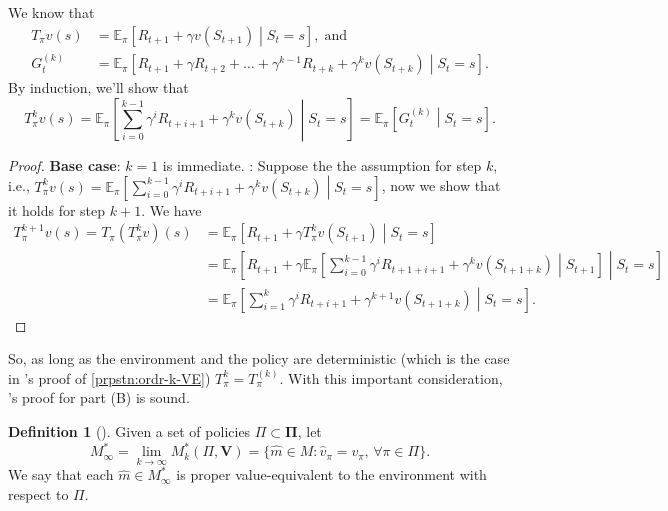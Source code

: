 \documentclass[a4paper]{article}
\theoremstyle{definition}
\newtheorem{definition}{Definition}
\theoremstyle{remark}
\theoremstyle{plain}
\newcommand{\bV}{\mathbf{V}}
\newcommand{\bPi}{\mathbf{\Pi}}
\newcommand{\E}{\mathbb{E}}
\begin{document}
We know that
\begin{align*}
    T_\pi v(s) & = \E_\pi \left[R_{t + 1} + \gamma v(S_{t + 1}) \middle\vert S_t = s\right], \; \text{and} \\
    G^{(k)}_t &= \E_\pi \left[R_{t + 1} + \gamma R_{t + 2} + \dots + \gamma^{k - 1} R_{t + k} + \gamma^k v(S_{t + k}) \middle\vert S_t = s\right].
\end{align*}
By induction, we'll show that
\begin{equation*}
    T^k_\pi v(s) = \E_\pi\left[\sum_{i = 0}^{k - 1} \gamma^i R_{t + i + 1} + \gamma^kv(S_{t + k}) \middle\vert S_t = s\right] = \E_\pi\left[G^{(k)}_t \middle\vert S_t = s\right].
\end{equation*}
%
\begin{proof}
\textbf{Base case}: $k = 1$ is immediate. : Suppose the the assumption for step $k$, i.e., $T^k_\pi v(s) = \E_\pi\left[\sum_{i = 0}^{k - 1} \gamma^i R_{t + i + 1} + \gamma^kv(S_{t + k}) \middle\vert S_t = s\right]$, now we show that it holds for step $k + 1$. We have
\begin{align*}
    T^{k + 1}_\pi v(s) = T_\pi\left(T^k_\pi v\right)(s) & = \E_\pi \left[R_{t + 1} + \gamma T^k_\pi v(S_{t + 1}) \middle\vert S_t = s\right] \\
    & = \E_\pi \left[R_{t + 1} + \gamma  \E_\pi\left[\sum_{i = 0}^{k - 1} \gamma^i R_{t + 1 + i + 1} + \gamma^kv(S_{t +1 + k}) \middle\vert S_{t + 1}\right] \middle\vert S_t = s\right] \\
    & = \E_\pi \left[\sum_{i = 1}^{k} \gamma^{i} R_{t + i + 1} + \gamma^{k+1} v(S_{t + 1 + k})  \middle\vert S_t = s\right]. & \tag{tower rule}
\end{align*}
\end{proof}
So, as long as the environment and the policy are deterministic (which is the case in \citet{grimm2021proper}'s proof of \cref{prpstn:ordr-k-VE}) $T^k_\pi = T^{(k)}_\pi$. With this important consideration, \citet{grimm2021proper}'s proof for part (B) is sound.
%
\begin{definition}[{\normalfont\citet[Definition 1]{grimm2021proper}}]
    \label{def:prp-ve}
    Given a set of policies $\Pi \subset \bPi$, let
    \begin{equation*}
        M_\infty^* = \lim_{k \to \infty} M_k^* (\Pi, \bV) = \{\hat{m} \in M: \hat{v}_\pi = v_\pi, \, \forall \pi \in \Pi \}.
    \end{equation*}
    We say that each $\hat{m} \in M_\infty^*$ is proper value-equivalent to the environment with respect to $\Pi$. 
\end{definition}
\end{document}
